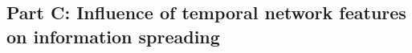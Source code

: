 \documentclass[letterpaper]{article}
\begin{document}
\subsection*{Part C: Influence of temporal network features on information spreading}
\todo{}
\end{document}
